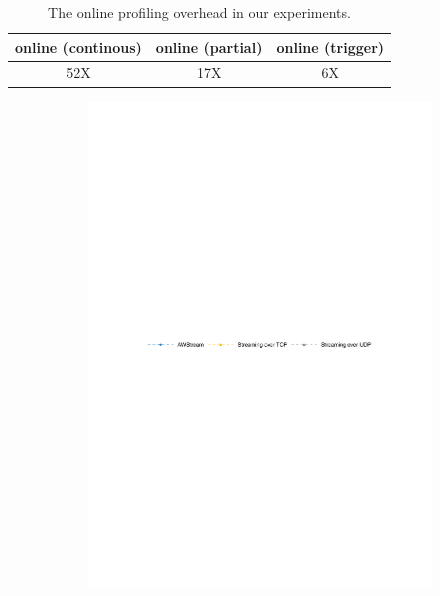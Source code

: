 
\begin{table}[t]
  \centering
  \begin{tabular}{c c c}
    \toprule
    online (continous) & online (partial) & online (trigger) \\
    \midrule
    52X   & 17X              & 6X \\
    \bottomrule
  \end{tabular}
  \caption{The online profiling overhead in our experiments.}
  \label{tab:online}
\end{table}

\begin{figure}
  \begin{subfigure}{\linewidth}
    \centering
    \includegraphics[width=0.9\columnwidth]{figures/runtime-legend.pdf}
  \end{subfigure}


\end{figure}
